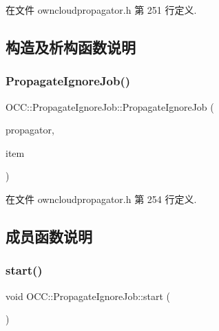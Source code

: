 在文件 owncloudpropagator.\+h 第 251 行定义.



\subsection{构造及析构函数说明}
\mbox{\label{class_o_c_c_1_1_propagate_ignore_job_a7c9519a8703a23c232bc5ff006ea86d3}} 
\subsubsection{\texorpdfstring{Propagate\+Ignore\+Job()}{PropagateIgnoreJob()}}
{\footnotesize\ttfamily O\+C\+C\+::\+Propagate\+Ignore\+Job\+::\+Propagate\+Ignore\+Job (\begin{DoxyParamCaption}\item[{\hyperlink{class_o_c_c_1_1_owncloud_propagator}{Owncloud\+Propagator} $\ast$}]{propagator,  }\item[{const \hyperlink{namespace_o_c_c_acb6b0db82893659fbd0c98d3c5b8e2b8}{Sync\+File\+Item\+Ptr} \&}]{item }\end{DoxyParamCaption})}



在文件 owncloudpropagator.\+h 第 254 行定义.



\subsection{成员函数说明}
\mbox{\label{class_o_c_c_1_1_propagate_ignore_job_ab4b6fd1aeabf3279ac136719dc3cf6fb}} 
\subsubsection{\texorpdfstring{start()}{start()}}
{\footnotesize\ttfamily void O\+C\+C\+::\+Propagate\+Ignore\+Job\+::start (\begin{DoxyParamCaption}{ }\end{DoxyParamCaption})\hspace{0.3cm}{\ttfamily [virtual]}}



